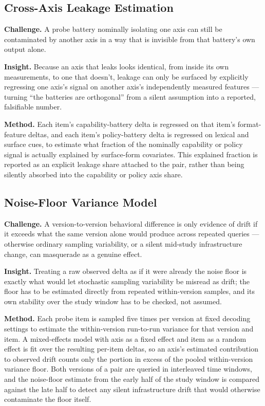 \documentclass[11pt]{article}
\begin{document}
\subsection{Cross-Axis Leakage Estimation}
\textbf{Challenge.} A probe battery nominally isolating one axis can still be contaminated by another axis in a way that is invisible from that battery's own output alone.

\textbf{Insight.} Because an axis that leaks looks identical, from inside its own measurements, to one that doesn't, leakage can only be surfaced by explicitly regressing one axis's signal on another axis's independently measured features --- turning ``the batteries are orthogonal'' from a silent assumption into a reported, falsifiable number.

\textbf{Method.} Each item's capability-battery delta is regressed on that item's format-feature deltas, and each item's policy-battery delta is regressed on lexical and surface cues, to estimate what fraction of the nominally capability or policy signal is actually explained by surface-form covariates. This explained fraction is reported as an explicit leakage share attached to the pair, rather than being silently absorbed into the capability or policy axis share.

\subsection{Noise-Floor Variance Model}
\textbf{Challenge.} A version-to-version behavioral difference is only evidence of drift if it exceeds what the same version alone would produce across repeated queries --- otherwise ordinary sampling variability, or a silent mid-study infrastructure change, can masquerade as a genuine effect.

\textbf{Insight.} Treating a raw observed delta as if it were already the noise floor is exactly what would let stochastic sampling variability be misread as drift; the floor has to be estimated directly from repeated within-version samples, and its own stability over the study window has to be checked, not assumed.

\textbf{Method.} Each probe item is sampled five times per version at fixed decoding settings to estimate the within-version run-to-run variance for that version and item. A mixed-effects model with axis as a fixed effect and item as a random effect is fit over the resulting per-item deltas, so an axis's estimated contribution to observed drift counts only the portion in excess of the pooled within-version variance floor. Both versions of a pair are queried in interleaved time windows, and the noise-floor estimate from the early half of the study window is compared against the late half to detect any silent infrastructure drift that would otherwise contaminate the floor itself.
\end{document}
